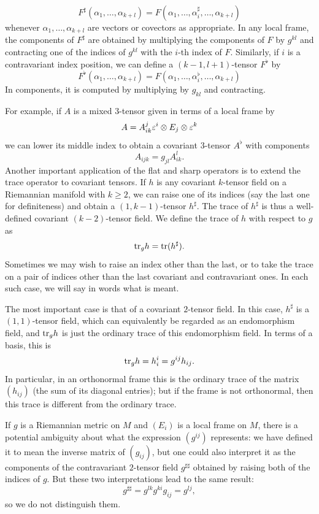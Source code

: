 \[F^\sharp(\alpha_1,\dots,\alpha_{k+l})=F(\alpha_1,\dots,\alpha_i^{\sharp},\dots,\alpha_{k+l})\]
whenever $\alpha_1,\dots,\alpha_{k+l}$ are vectors or covectors as appropriate. 
In any local frame, the components of $F^{\sharp}$ are obtained by multiplying 
the components of $F$ by $g^{kl}$ and contracting one of the indices of $g^{kl}$ 
with the $i$-th index of $F$. Similarly, if $i$ is a contravariant index 
position, we can define a $(k-1,l+1)$-tensor $F^{\flat}$ by
\[F^\flat(\alpha_1,\dots,\alpha_{k+l})=F(\alpha_1,\dots,\alpha_i^{\flat},\dots,\alpha_{k+l})\]
In components, it is computed by multiplying by $g_{kl}$ and contracting.\par
For example, if $A$ is a mixed $3$-tensor given in terms of a local frame by
\[A=A^{j}_{ik}\varepsilon^i\otimes E_j\otimes\varepsilon^k\]
we can lower its middle index to obtain a covariant $3$-tensor $A^{\flat}$ with
components
\[A_{ijk}=g_{jl}A_{ik}^{l}.\]
Another important application of the flat and sharp operators is to extend 
the trace operator to covariant tensors. If $h$ is any covariant $k$-tensor 
field on a Riemannian manifold with $k\geq 2$, we can raise one of its 
indices (say the last one for definiteness) and obtain a $(1,k-1)$-tensor $h^{\sharp}$. 
The trace of $h^{\sharp}$ is thus a well-defined covariant $(k-2)$-tensor 
field. We define the trace of $h$ with respect to $g$ as
\[\mathrm{tr}_gh=\mathrm{tr}(h^\sharp).\]
Sometimes we may wish to raise an index other than the last, or to take 
the trace on a pair of indices other than the last covariant and 
contravariant ones. In each such case, we will say in words what is meant.\par
The most important case is that of a covariant $2$-tensor field. In this case, 
$h^{\sharp}$ is a $(1,1)$-tensor field, which can equivalently be regarded 
as an endomorphism field, and $\mathrm{tr}_gh$ is just the ordinary trace of this 
endomorphism field. In terms of a basis, this is
\[\mathrm{tr}_gh=h^i_i=g^{ij}h_{ij}.\]
In particular, in an orthonormal frame this is the ordinary trace of the 
matrix $(h_{ij})$ (the sum of its diagonal entries); but if the frame is 
not orthonormal, then this trace is different from the ordinary trace.\par
If $g$ is a Riemannian metric on $M$ and $(E_i)$ is a local frame on $M$, there 
is a potential ambiguity about what the expression $(g^{ij})$ represents: 
we have defined it to mean the inverse matrix of $(g_{ij})$, but one could 
also interpret it as the components of the contravariant $2$-tensor field 
$g^{\sharp\sharp}$ obtained by raising both of the indices of $g$. But these 
two interpretations lead to the same result:
\[g^{\sharp\sharp}=g^{lk}g^{ki}g_{ij}=g^{lj},\]
so we do not distinguish them.
